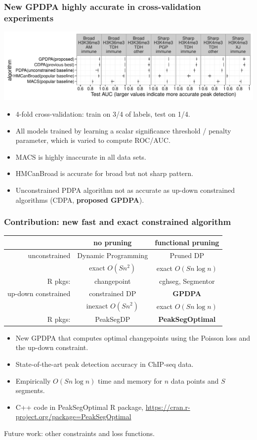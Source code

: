 \documentclass{beamer}
\begin{document}
\begin{frame}
  \frametitle{New GPDPA highly accurate in cross-validation experiments}
  \includegraphics[width=\textwidth]{figure-test-error-dots}
  \begin{itemize}
  \item 4-fold cross-validation: train on 3/4 of labels, test on 1/4.
  \item All models trained by learning a scalar significance
    threshold / penalty parameter, which is varied to compute ROC/AUC.
  \item MACS is highly inaccurate in all data sets.
  \item HMCanBroad is accurate for broad but not sharp pattern.
  \item Unconstrained PDPA algorithm not as accurate as up-down
    constrained algorithms (CDPA, \textbf{proposed GPDPA}).
  \end{itemize}
  \scriptsize
\end{frame}

\begin{frame}
  \frametitle{Contribution: new fast and exact constrained algorithm}
  \begin{tabular}{r|c|c}
    & no pruning & functional pruning \\
    \hline
    unconstrained & Dynamic Programming & Pruned DP \\
     & exact $O(S n^2)$ & exact $O(Sn\log n)$\\
    R pkgs: & changepoint & cghseg, Segmentor\\
    \hline
    up-down constrained & constrained DP & \textbf{GPDPA} \\
     & inexact $O(Sn^2)$ & exact $O(Sn\log n)$\\
    R pkgs: & PeakSegDP & \textbf{PeakSegOptimal}\\
    \hline 
  \end{tabular}
  \begin{itemize}
  \item New GPDPA that computes optimal changepoints 
    using the Poisson loss and the up-down constraint.
  \item State-of-the-art peak detection accuracy in ChIP-seq data.
  \item Empirically $O(S n \log n)$ time and memory for $n$ data
    points and $S$ segments.
  \item C++ code in PeakSegOptimal R package, 
    \url{https://cran.r-project.org/package=PeakSegOptimal}
  \end{itemize}
  Future work: other constraints and loss functions.
\end{frame}
\end{document}
